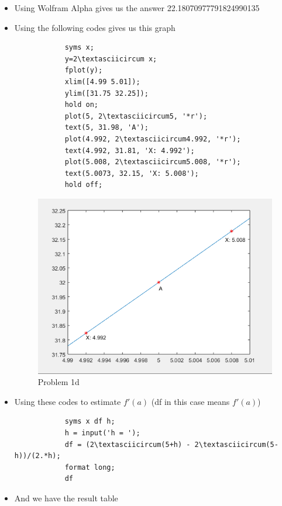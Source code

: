 \documentclass[12pt,en,a4paper]{article}
\begin{document}
	\begin{itemize}
		\item Using Wolfram Alpha gives us the answer 22.18070977791824990135
		\item Using the following codes gives us this graph
		\begin{mdframed}[hidealllines=true,backgroundcolor=magenta!10]
			\begin{lstlisting}
			syms x;
			y=2\textasciicircum x;
			fplot(y);
			xlim([4.99 5.01]);
			ylim([31.75 32.25]);
			hold on;
			plot(5, 2\textasciicircum5, '*r');
			text(5, 31.98, 'A');
			plot(4.992, 2\textasciicircum4.992, '*r');
			text(4.992, 31.81, 'X: 4.992');
			plot(5.008, 2\textasciicircum5.008, '*r');
			text(5.0073, 32.15, 'X: 5.008');
			hold off;
			\end{lstlisting}
		\end{mdframed}
		\begin{figure}[h]
			\centering
			\includegraphics[scale=0.5]{1d.png}
			\caption*{Problem 1d}
			\label{prob1d}
		\end{figure}
		\item Using these codes to estimate \(f'(a)\) (df in this case means \(f'(a)\))\\
		\begin{mdframed}[hidealllines=true,backgroundcolor=magenta!10]
			\begin{lstlisting}
			syms x df h;
			h = input('h = ');
			df = (2\textasciicircum(5+h) - 2\textasciicircum(5-h))/(2.*h);
			format long;
			df
			\end{lstlisting}
		\end{mdframed}
		\item And we have the result table
		

\end{itemize}
\end{document}
